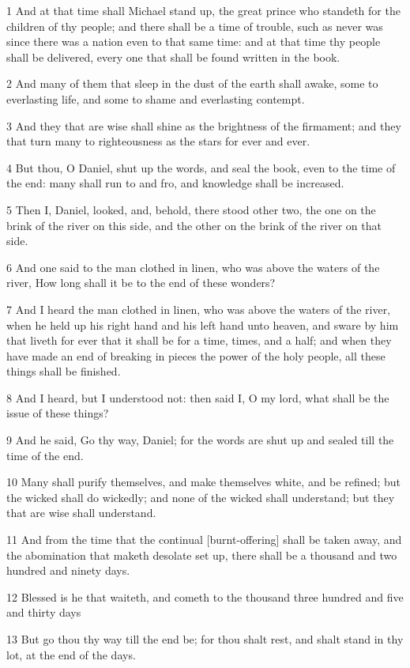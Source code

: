 \par 1 And at that time shall Michael stand up, the great prince who standeth for the children of thy people; and there shall be a time of trouble, such as never was since there was a nation even to that same time: and at that time thy people shall be delivered, every one that shall be found written in the book.
\par 2 And many of them that sleep in the dust of the earth shall awake, some to everlasting life, and some to shame and everlasting contempt.
\par 3 And they that are wise shall shine as the brightness of the firmament; and they that turn many to righteousness as the stars for ever and ever.
\par 4 But thou, O Daniel, shut up the words, and seal the book, even to the time of the end: many shall run to and fro, and knowledge shall be increased.
\par 5 Then I, Daniel, looked, and, behold, there stood other two, the one on the brink of the river on this side, and the other on the brink of the river on that side.
\par 6 And one said to the man clothed in linen, who was above the waters of the river, How long shall it be to the end of these wonders?
\par 7 And I heard the man clothed in linen, who was above the waters of the river, when he held up his right hand and his left hand unto heaven, and sware by him that liveth for ever that it shall be for a time, times, and a half; and when they have made an end of breaking in pieces the power of the holy people, all these things shall be finished.
\par 8 And I heard, but I understood not: then said I, O my lord, what shall be the issue of these things?
\par 9 And he said, Go thy way, Daniel; for the words are shut up and sealed till the time of the end.
\par 10 Many shall purify themselves, and make themselves white, and be refined; but the wicked shall do wickedly; and none of the wicked shall understand; but they that are wise shall understand.
\par 11 And from the time that the continual [burnt-offering] shall be taken away, and the abomination that maketh desolate set up, there shall be a thousand and two hundred and ninety days.
\par 12 Blessed is he that waiteth, and cometh to the thousand three hundred and five and thirty days
\par 13 But go thou thy way till the end be; for thou shalt rest, and shalt stand in thy lot, at the end of the days.

